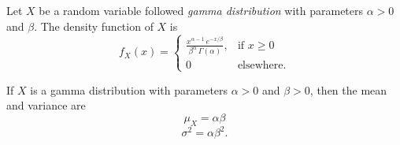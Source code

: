 \begin{definition}
    Let $X$ be a random variable followed \textit{gamma distribution} with parameters $\alpha > 0$ and 
    $\beta$. The density function of $X$ is 
    \begin{equation}
        f_X(x) = \begin{cases}
            \displaystyle \frac{x^{\alpha - 1}\, e^{-x/\beta}}{\beta^\alpha\, \Gamma(\alpha)}, & \text{if } x \geq 0\\
            0 & \text{elsewhere}.
        \end{cases}
    \end{equation}
\end{definition}

\begin{theorem}
    If $X$ is a gamma distribution with parameters $\alpha > 0$ and $\beta > 0$, then the mean and 
    variance are 
    \begin{equation}
        \mu_X = \alpha \beta
    \end{equation}
    \begin{equation}
        \sigma^2 = \alpha \beta^2.
    \end{equation}
\end{theorem}

